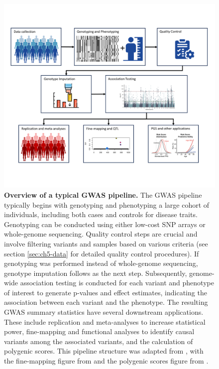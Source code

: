 \begin{figure}[h!]
    \centering
    \includegraphics[width=\textwidth]{figures/thesis_qd_gwas_pipeline.png}
    \caption{
    \textbf{Overview of a typical GWAS pipeline.} The GWAS pipeline typically begins with genotyping and phenotyping a large cohort of individuals, including both cases and controls for disease traits. Genotyping can be conducted using either low-cost SNP arrays or whole-genome sequencing. Quality control steps are crucial and involve filtering variants and samples based on various criteria (see section \ref{sec:ch5-data} for detailed quality control procedures). If genotyping was performed instead of whole-genome sequencing, genotype imputation follows as the next step. Subsequently, genome-wide association testing is conducted for each variant and phenotype of interest to generate p-values and effect estimates, indicating the association between each variant and the phenotype. The resulting GWAS summary statistics have several downstream applications. These include replication and meta-analyses to increase statistical power, fine-mapping and functional analyses to identify causal variants among the associated variants, and the calculation of polygenic scores. This pipeline structure was adapted from \cite{uffelmann2021genome}, with the fine-mapping figure from \cite{Wang} and the polygenic scores figure from \cite{wand2021improving}.}
    \label{fig:qd-intro}
\end{figure}

